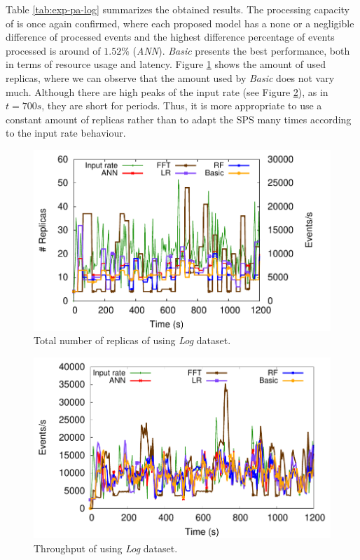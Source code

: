 Table \ref{tab:exp-pa-log} summarizes the obtained results. The processing capacity of \pSPS{}  is once again confirmed, where each proposed model has a none or a negligible difference of processed events and the highest difference percentage of events processed is around of $1.52\%$ (\textit{ANN}).
\textit{Basic} presents the best performance, both in terms of resource usage and latency. Figure \ref{fig:exp-pa-log-replicas} shows the amount of used replicas, where we can observe that the amount used by \textit{Basic} does not vary much. Although there are high peaks of the input rate (see Figure \ref{fig:exp-pa-log-throughput}), as in $t=700s$, they are short for periods. Thus, it is more appropriate to use a constant amount of replicas rather than to adapt the SPS many times according to the input rate behaviour.

\begin{figure}[!ht]
    \centering
    \includegraphics[width=0.75\linewidth]{figures/exp/predictive/Log-Replicas.pdf}
    \caption{Total number of replicas of \pSPS{} using \textit{Log} dataset.}
    \label{fig:exp-pa-log-replicas}
\end{figure}

\begin{figure}[!ht]
    \centering
    \includegraphics[width=0.75\linewidth]{figures/exp/predictive/Log-Throughput.pdf}
    \caption{Throughput of \pSPS{} using \textit{Log} dataset.}
    \label{fig:exp-pa-log-throughput}
\end{figure}

